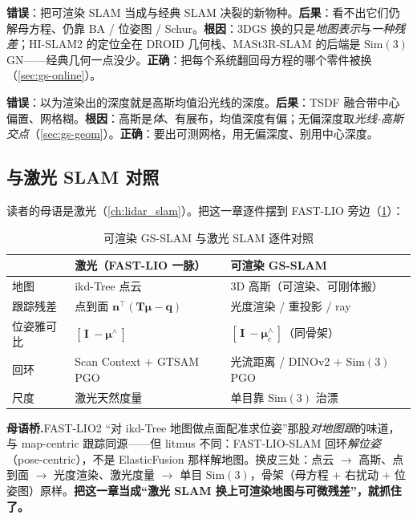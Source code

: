 \begin{pitfall}
\textbf{错误}：把可渲染 SLAM 当成与经典 SLAM 决裂的新物种。\textbf{后果}：看不出它们仍解母方程、仍靠 BA / 位姿图 / Schur。\textbf{根因}：3DGS 换的只是\emph{地图表示}与\emph{一种残差}；HI-SLAM2 的定位全在 DROID 几何栈、MASt3R-SLAM 的后端是 $\mathrm{Sim}(3)$ GN——经典几何一点没少。\textbf{正确}：把每个系统翻回母方程的哪个零件被换（\cref{sec:gs-online}）。
\end{pitfall}

\begin{pitfall}[“渲染深度 $=$ 高斯中心深度”]
\textbf{错误}：以为渲染出的深度就是高斯均值沿光线的深度。\textbf{后果}：TSDF 融合带中心偏置、网格糊。\textbf{根因}：高斯是\emph{体}、有展布，均值深度有偏；无偏深度取\emph{光线-高斯交点}（\cref{sec:gs-geom}）。\textbf{正确}：要出可测网格，用无偏深度、别用中心深度。
\end{pitfall}

\subsection{与激光 SLAM 对照}

读者的母语是激光（\cref{ch:lidar_slam}）。把这一章逐件摆到 FAST-LIO 旁边（\cref{tab:gs-lidar}）：

\begin{table}[H]\centering
\caption{可渲染 GS-SLAM 与激光 SLAM 逐件对照}
\label{tab:gs-lidar}
\small
\begin{tabular}{@{}lll@{}}
\toprule
 & 激光（FAST-LIO 一脉）& 可渲染 GS-SLAM \\
\midrule
地图 & ikd-Tree 点云 & 3D 高斯（可渲染、可刚体搬）\\
跟踪残差 & 点到面 $\mathbf n^\top(\mathbf T\boldsymbol\mu-\mathbf q)$ & 光度渲染 / 重投影 / ray \\
位姿雅可比 & $[\,\mathbf I\ -\boldsymbol\mu^\wedge\,]$ & $[\,\mathbf I\ -\boldsymbol\mu_c^\wedge\,]$（同骨架）\\
回环 & Scan Context $+$ GTSAM PGO & 光流距离 / DINOv2 $+$ $\mathrm{Sim}(3)$ PGO \\
尺度 & 激光天然度量 & 单目靠 $\mathrm{Sim}(3)$ 治漂 \\
\bottomrule
\end{tabular}
\end{table}

\begin{note}
\textbf{母语桥.}\;FAST-LIO2 “对 ikd-Tree 地图做点面配准求位姿”那股\emph{对地图跟}的味道，与 map-centric 跟踪同源——但 litmus 不同：FAST-LIO-SLAM 回环\emph{解位姿}（pose-centric），不是 ElasticFusion 那样解地图。换皮三处：点云 $\to$ 高斯、点到面 $\to$ 光度渲染、激光度量 $\to$ 单目 $\mathrm{Sim}(3)$，骨架（母方程 $+$ 右扰动 $+$ 位姿图）原样。\textbf{把这一章当成“激光 SLAM 换上可渲染地图与可微残差”，就抓住了。}
\end{note}


